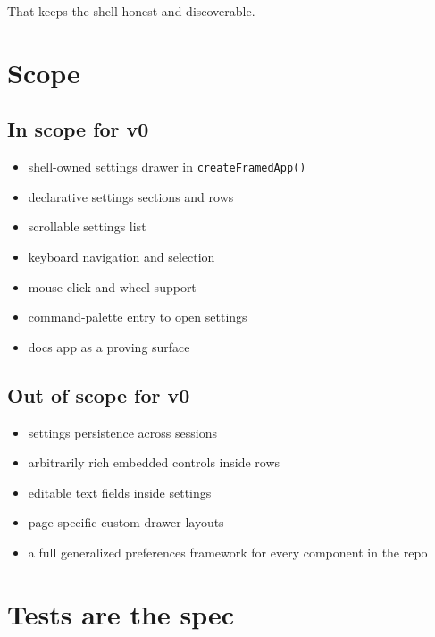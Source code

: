 That keeps the shell honest and discoverable.

\section{Scope}\label{record-057-scope}

\subsection{In scope for v0}\label{record-057-in-scope-for-v0}

\begin{itemize}
\tightlist
\item
  shell-owned settings drawer in \texttt{c\allowbreak{}r\allowbreak{}e\allowbreak{}a\allowbreak{}t\allowbreak{}e\allowbreak{}F\allowbreak{}r\allowbreak{}a\allowbreak{}m\allowbreak{}e\allowbreak{}d\allowbreak{}A\allowbreak{}p\allowbreak{}p\allowbreak{}(\allowbreak{})}
\item
  declarative settings sections and rows
\item
  scrollable settings list
\item
  keyboard navigation and selection
\item
  mouse click and wheel support
\item
  command-palette entry to open settings
\item
  docs app as a proving surface
\end{itemize}

\subsection{Out of scope for v0}\label{record-057-out-of-scope-for-v0}

\begin{itemize}
\tightlist
\item
  settings persistence across sessions
\item
  arbitrarily rich embedded controls inside rows
\item
  editable text fields inside settings
\item
  page-specific custom drawer layouts
\item
  a full generalized preferences framework for every component in the repo
\end{itemize}

\section{Tests are the spec}\label{record-057-tests-are-the-spec}

